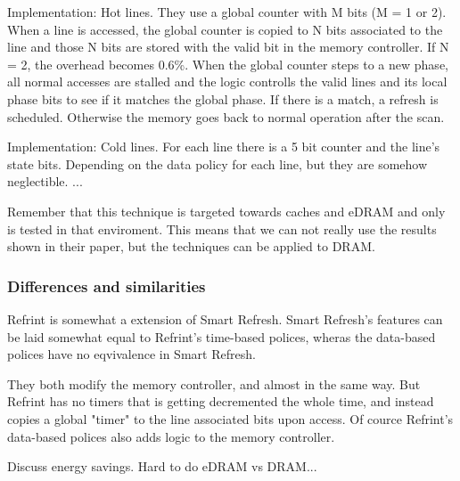 Implementation: Hot lines. They use a global counter with M bits (M = 1 or 2). When a line is accessed, the global counter is copied to N bits associated to the line and those N bits are stored with the valid bit in the memory controller. If N = 2, the overhead becomes 0.6\%. When the global counter steps to a new phase, all normal accesses are stalled and the logic controlls the valid lines and its local phase bits to see if it matches the global phase. If there is a match, a refresh is scheduled. Otherwise the memory goes back to normal operation after the scan. 

Implementation: Cold lines. For each line there is a 5 bit counter and the line's state bits. Depending on the data policy  for each line, but they are somehow neglectible.  ...

Remember that this technique is targeted towards caches and eDRAM and only is tested in that enviroment. This means that we can not really use the results shown in their paper, but the techniques can be applied to DRAM.

\subsubsection*{Differences and similarities}

Refrint is somewhat a extension of Smart Refresh. Smart Refresh's features can be laid somewhat equal to Refrint's time-based polices, wheras the data-based polices have no eqvivalence in Smart Refresh.

They both modify the memory controller, and almost in the same way. But Refrint has no timers that is getting decremented the whole time, and instead copies a global "timer" to the line associated bits upon access. Of cource Refrint's data-based polices also adds logic to the memory controller.

Discuss energy savings. Hard to do eDRAM vs DRAM...

